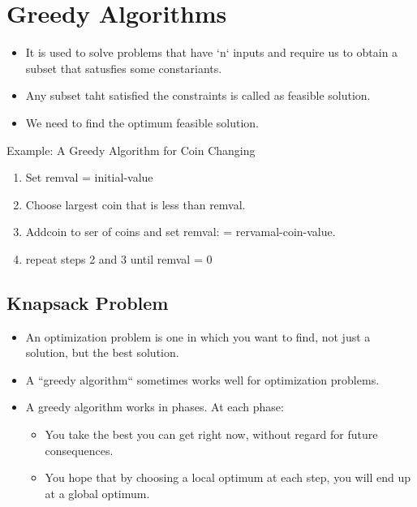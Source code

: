 \documentclass{article}
\begin{document}
\section{Greedy Algorithms}
\begin{itemize}
	\item It is used to solve problems that have `n` inputs and require us to obtain a subset that satusfies some constariants.
	\item Any subset taht satisfied the constraints is called as feasible solution.
	\item We need to find the optimum feasible solution.
\end{itemize}
Example: A Greedy Algorithm for Coin Changing
\begin{enumerate}
	\item Set remval = initial-value
	\item Choose largest coin that is less than remval.
	\item Addcoin to ser of coins and set remval: = rervamal-coin-value.
	\item repeat steps 2 and 3 until remval = 0
\end{enumerate}
\subsection{Knapsack Problem}
\begin{itemize}
	\item An optimization problem is one in which you want to find, not just a solution, but the best solution.
	\item A ``greedy algorithm`` sometimes works well for optimization problems.
	\item A greedy algorithm works in phases. At each phase:
		\begin{itemize}
			\item You take the best you can get right now, without regard for future consequences.
			\item You hope that by choosing a local optimum at each step, you will end up at a global optimum.
		\end{itemize}
\end{itemize}
                                          
\end{document}
